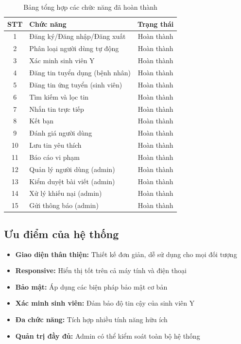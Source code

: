\documentclass[12pt,a4paper]{report}
\begin{document}
\begin{table}[H]
\centering
\caption{Bảng tổng hợp các chức năng đã hoàn thành}
\begin{tabular}{|c|l|c|}
\hline
\textbf{STT} & \textbf{Chức năng} & \textbf{Trạng thái} \\
\hline
1 & Đăng ký/Đăng nhập/Đăng xuất & Hoàn thành \\
2 & Phân loại người dùng tự động & Hoàn thành \\
3 & Xác minh sinh viên Y & Hoàn thành \\
4 & Đăng tin tuyển dụng (bệnh nhân) & Hoàn thành \\
5 & Đăng tin ứng tuyển (sinh viên) & Hoàn thành \\
6 & Tìm kiếm và lọc tin & Hoàn thành \\
7 & Nhắn tin trực tiếp & Hoàn thành \\
8 & Kết bạn & Hoàn thành \\
9 & Đánh giá người dùng & Hoàn thành \\
10 & Lưu tin yêu thích & Hoàn thành \\
11 & Báo cáo vi phạm & Hoàn thành \\
12 & Quản lý người dùng (admin) & Hoàn thành \\
13 & Kiểm duyệt bài viết (admin) & Hoàn thành \\
14 & Xử lý khiếu nại (admin) & Hoàn thành \\
15 & Gửi thông báo (admin) & Hoàn thành \\
\hline
\end{tabular}
\end{table}

\subsection{Ưu điểm của hệ thống}

\begin{itemize}
    \item \textbf{Giao diện thân thiện:} Thiết kế đơn giản, dễ sử dụng cho mọi đối tượng
    \item \textbf{Responsive:} Hiển thị tốt trên cả máy tính và điện thoại
    \item \textbf{Bảo mật:} Áp dụng các biện pháp bảo mật cơ bản
    \item \textbf{Xác minh sinh viên:} Đảm bảo độ tin cậy của sinh viên Y
    \item \textbf{Đa chức năng:} Tích hợp nhiều tính năng hữu ích
    \item \textbf{Quản trị đầy đủ:} Admin có thể kiểm soát toàn bộ hệ thống
\end{itemize}
\end{document}
